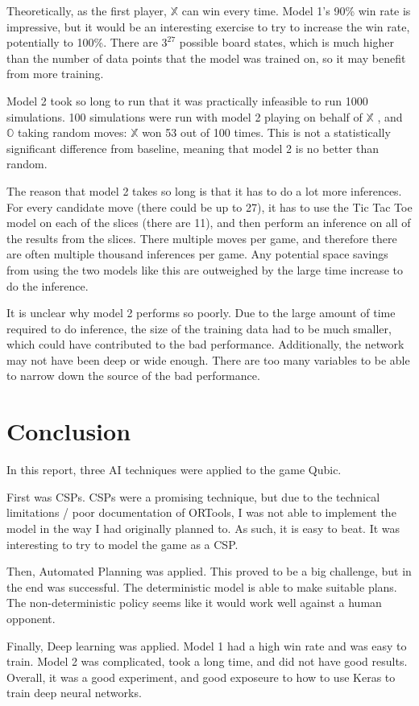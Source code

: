 \documentclass[11pt]{article}
\newcommand{\XX}{$\mathbb{X}$ }
\newcommand{\OO}{$\mathbb{O}$ }
\begin{document}
Theoretically, as the first player, \XX can win every time. Model 1's 90\% win rate is impressive, but it would be an interesting exercise to try to increase the win rate, potentially to 100\%. There are $3^{27}$ possible board states, which is much higher than the number of data points that the model was trained on, so it may benefit from more training.

Model 2 took so long to run that it was practically infeasible to run 1000 simulations. 100 simulations were run with model 2 playing on behalf of \XX, and \OO taking random moves:  \XX won 53 out of 100 times. This is not a statistically significant difference from baseline, meaning that model 2 is no better than random.

The reason that model 2 takes so long is that it has to do a lot more inferences. For every candidate move (there could be up to 27), it has to use the Tic Tac Toe model on each of the slices (there are 11), and then perform an inference on all of the results from the slices. There multiple moves per game, and therefore there are often multiple thousand inferences per game. Any potential space savings from using the two models like this are outweighed by the large time increase to do the inference.

It is unclear why model 2 performs so poorly. Due to the large amount of time required to do inference, the size of the training data had to be much smaller, which could have contributed to the bad performance. Additionally, the network may not have been deep or wide enough. There are too many variables to be able to narrow down the source of the bad performance.

\section{Conclusion}
In this report, three AI techniques were applied to the game Qubic. 

First was CSPs. CSPs were a promising technique, but due to the technical limitations / poor documentation of ORTools, I was not able to implement the model in the way I had originally planned to. As such, it is easy to beat. It was interesting to try to model the game as a CSP.

Then, Automated Planning was applied. This proved to be a big challenge, but in the end was successful. The deterministic model is able to make suitable plans. The non-deterministic policy seems like it would work well against a human opponent.

Finally, Deep learning was applied. Model 1 had a high win rate and was easy to train. Model 2 was complicated, took a long time, and did not have good results. Overall, it was a good experiment, and good exposeure to how to use Keras to train deep neural networks.
\end{document}
